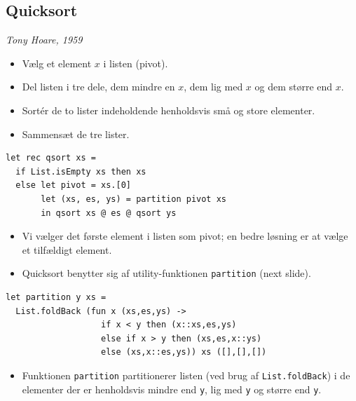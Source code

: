 \documentclass[rgb]{beamer}
\begin{document}
\subsection{Quicksort}
\begin{frame}[fragile]
\begin{footnotesize}


  \emph{Tony Hoare, 1959}

  \begin{itemize}
  \item Vælg et element $x$ i listen (pivot).
  \item Del listen i tre dele, dem mindre en $x$, dem lig med $x$ og dem større end $x$.
  \item Sort\'er de to lister indeholdende henholdsvis små og store elementer.
  \item Sammensæt de tre lister.
  \end{itemize}


\begin{lstlisting}[numbers=none,frame=none,mathescape]
let rec qsort xs =
  if List.isEmpty xs then xs
  else let pivot = xs.[0]
       let (xs, es, ys) = partition pivot xs
       in qsort xs @ es @ qsort ys
\end{lstlisting}

\begin{itemize}
\item Vi vælger det første element i listen som pivot; en bedre løsning er at vælge et tilfældigt element.
\item Quicksort benytter sig af utility-funktionen \lstinline{partition} (next slide).
\end{itemize}
\end{footnotesize}
\end{frame}

\begin{frame}[fragile]
\begin{footnotesize}

\vspace{1ex}

\begin{lstlisting}[numbers=none,frame=none,mathescape]
let partition y xs =
  List.foldBack (fun x (xs,es,ys) ->
                   if x < y then (x::xs,es,ys)
                   else if x > y then (xs,es,x::ys)
                   else (xs,x::es,ys)) xs ([],[],[])
\end{lstlisting}

\begin{itemize}
\item Funktionen \lstinline{partition} partitionerer listen (ved brug
  af \lstinline{List.foldBack}) i de elementer der er henholdsvis mindre end
  \lstinline{y}, lig med \lstinline{y} og større end \lstinline{y}.
\end{itemize}

\end{footnotesize}
\end{frame}
\end{document}
